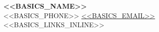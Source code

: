 \begin{center}
  {\fontsize{18}{28}\selectfont \textbf{<<BASICS_NAME>>}}\\[0.25em]
  <<BASICS_PHONE>> \textbar{}
  \href{mailto:<<BASICS_EMAIL_URL>>}{<<BASICS_EMAIL>>} \textbar{}
  <<BASICS_LINKS_INLINE>>
\end{center}
